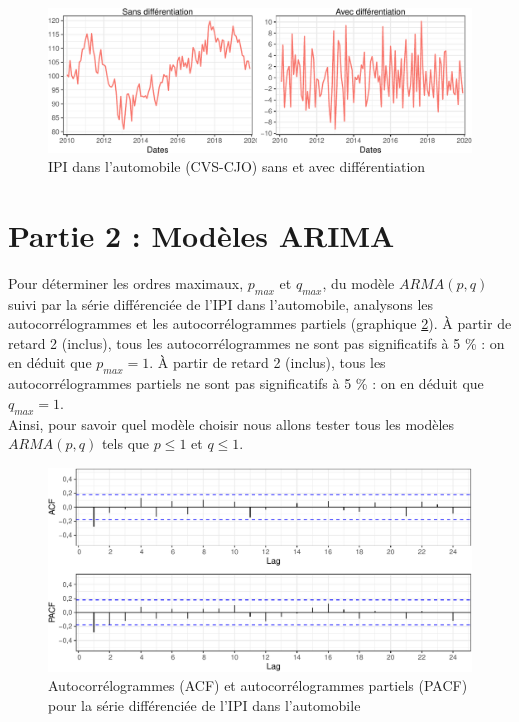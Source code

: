 \documentclass[]{article}
\begin{document}
\begin{figure}

{\centering \includegraphics{img/rmd-compGraph-1} 

}

\caption{IPI dans l'automobile (CVS-CJO) sans et avec différentiation}\label{fig:compGraph}
\end{figure}

\hypertarget{partie-2-moduxe8les-arima}{%
\section{Partie 2 : Modèles ARIMA}\label{partie-2-moduxe8les-arima}}

Pour déterminer les ordres maximaux, \(p_{max}\) et \(q_{max}\), du modèle \(ARMA(p,q)\) suivi par la série différenciée de l'IPI dans l'automobile, analysons les autocorrélogrammes et les autocorrélogrammes partiels (graphique \ref{fig:acfPacf}).
À partir de retard 2 (inclus), tous les autocorrélogrammes ne sont pas significatifs à 5 \% : on en déduit que \(p_{max} = 1\).
À partir de retard 2 (inclus), tous les autocorrélogrammes partiels ne sont pas significatifs à 5 \% : on en déduit que \(q_{max} = 1\).\\
Ainsi, pour savoir quel modèle choisir nous allons tester tous les modèles \(ARMA(p,q)\) tels que \(p\leq 1\) et \(q\leq 1\).

\begin{figure}

{\centering \includegraphics{img/rmd-acfPacf-1} 

}

\caption{Autocorrélogrammes (ACF) et autocorrélogrammes partiels (PACF) pour la série différenciée de l'IPI dans l'automobile}\label{fig:acfPacf}
\end{figure}
\end{document}
